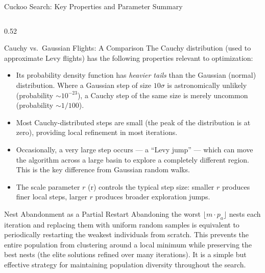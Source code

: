 \documentclass[aspectratio=169,10pt]{beamer}
\begin{document}
\begin{frame}[allowframebreaks]{Cuckoo Search: Key Properties and Parameter Summary}

  \begin{columns}[T]
    \begin{column}{0.52\textwidth}
      \begin{block}{Cauchy vs.\ Gaussian Flights: A Comparison}
        The Cauchy distribution (used to approximate Levy flights)
        has the following properties relevant to optimization:
        \begin{itemize}
          \item Its probability density function has \emph{heavier
                tails} than the Gaussian (normal) distribution.
                Where a Gaussian step of size $10\sigma$ is
                astronomically unlikely (probability $\sim 10^{-23}$),
                a Cauchy step of the same size is merely uncommon
                (probability $\sim 1/100$).
          \item Most Cauchy-distributed steps are small (the peak
                of the distribution is at zero), providing local
                refinement in most iterations.
          \item Occasionally, a very large step occurs --- a
                ``Levy jump'' --- which can move the algorithm
                across a large basin to explore a completely
                different region.  This is the key difference
                from Gaussian random walks.
          \item The scale parameter $r$ (r) controls the typical
                step size: smaller $r$ produces finer local steps,
                larger $r$ produces broader exploration jumps.
        \end{itemize}
      \end{block}

      \begin{block}{Nest Abandonment as a Partial Restart}
        Abandoning the worst $\lfloor m \cdot p_a \rfloor$ nests
        each iteration and replacing them with uniform random samples
        is equivalent to periodically restarting the weakest
        individuals from scratch.  This prevents the entire
        population from clustering around a local minimum while
        preserving the best nests (the elite solutions refined
        over many iterations).  It is a simple but effective strategy
        for maintaining population diversity throughout the search.


\end{block}
\end{column}
\end{columns}
\end{frame}
\end{document}

